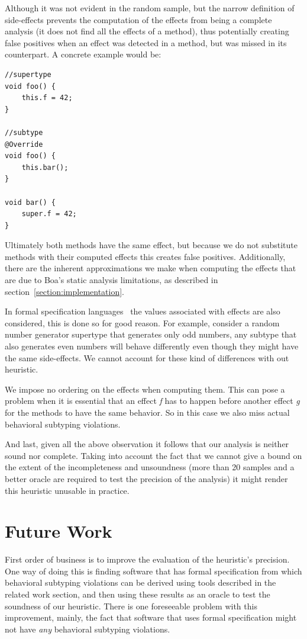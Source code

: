\documentclass{acm_proc_article-sp}
\begin{document}
Although it was not evident in the random sample, but the narrow definition of side-effects prevents the computation of the effects from being a complete analysis (it does not find all the effects of a method), thus potentially creating false positives when an effect was detected in a method, but was missed in its counterpart. A concrete example would be:
\begin{lstlisting}
//supertype
void foo() {
    this.f = 42;
}

//subtype
@Override
void foo() {
    this.bar();
}

void bar() {
    super.f = 42;
}
\end{lstlisting}
Ultimately both methods have the same effect, but because we do not substitute methods with their computed effects this creates false positives. Additionally, there are the inherent approximations we make when computing the effects that are due to Boa's static analysis limitations, as described in section~\ref{section:implementation}.

In formal specification languages~\cite{leavens2006jml, leavens2006design} the values associated with effects are also considered, this is done so for good reason. For example, consider a random number generator supertype that generates only odd numbers, any subtype that also generates even numbers will behave differently even though they might have the same side-effects. We cannot account for these kind of differences with out heuristic.

We impose no ordering on the effects when computing them. This can pose a problem when it is essential that an effect \emph{f} has to happen before another effect \emph{g} for the methods to have the same behavior. So in this case we also miss actual behavioral subtyping violations.

And last, given all the above observation it follows that our analysis is neither sound nor complete. Taking into account the fact that we cannot give a bound on the extent of the incompleteness and unsoundness (more than 20 samples and a better oracle are required to test the precision of the analysis) it might render this heuristic unusable in practice.

\section{Future Work}\label{section:future}
First order of business is to improve the evaluation of the heuristic's precision. One way of doing this is finding software that has formal specification from which behavioral subtyping violations can be derived using tools described in the related work section, and then using these results as an oracle to test the soundness of our heuristic. There is one foreseeable problem with this improvement, mainly, the fact that software that uses formal specification might not have \emph{any} behavioral subtyping violations.
\end{document}

